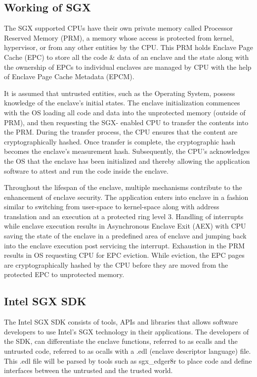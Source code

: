 \documentclass[article, doublespace,nopageskip]{VTthesis} %
\begin{document}
    \subsection{Working of SGX} \label{ss: Working of SGX}
    The SGX supported CPUs have their own private memory called Processor Reserved Memory (PRM), a memory whose access is protected from kernel, hypervisor, or from any other entities by the CPU. This PRM holds Enclave Page Cache (EPC) to store all the code \& data of an enclave and the state along with the ownership of EPCs to individual enclaves are managed by CPU with the help of Enclave Page Cache Metadata (EPCM). \ 

    It is assumed that untrusted entities, such as the Operating System, possess knowledge of the enclave's initial states. The enclave initialization commences with the OS loading all code and data into the unprotected memory (outside of PRM), and then requesting the SGX- enabled CPU to transfer the contents into the PRM. During the transfer process, the CPU ensures that the content are cryptographically hashed. Once transfer is complete, the cryptographic hash becomes the enclave's measurement hash. Subsequently, the CPU's acknowledges the OS that the enclave has been initialized and thereby allowing the application software to attest and run the code inside the enclave. \

    Throughout the lifespan of the enclave, multiple mechanisms contribute to the enhancement of enclave security. The application enters into enclave in a fashion similar to switching from user-space to kernel-space along with address translation and an execution at a protected ring level 3. Handling of interrupts while enclave execution results in Asynchronous Enclave Exit (AEX) with CPU saving the state of the enclave in a predefined area of enclave and jumping back into the enclave execution post servicing the interrupt. Exhaustion in the PRM results in OS requesting CPU for EPC eviction. While eviction, the EPC pages are cryptographically hashed by the CPU before they are moved from the protected EPC to unprotected memory.   

    \subsection{Intel SGX SDK} \label{ase:Intel SGX SDK}
    The Intel SGX SDK \cite{Intel-SGX} consists of tools, APIs and libraries that allows software developers to use Intel's SGX technology in their applications. The developers of the SDK, can differentiate the enclave functions, referred to as ecalls and the untrusted code, referred to as ocalls with a .edl (enclave descriptor language) file. This .edl file will be parsed by tools such as sgx\_edger8r to place code and define interfaces between the untrusted and the trusted world.
\end{document}
